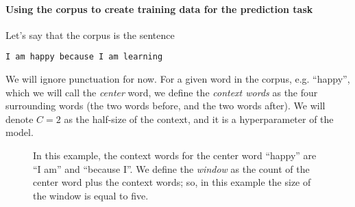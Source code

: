 \documentclass[12pt]{article}
\begin{document}
\paragraph{Using the corpus to create training data for the prediction task} Let's say that the corpus is the sentence
\begin{verbatim}
I am happy because I am learning
\end{verbatim}
We will ignore punctuation for now. For a given word in the corpus, e.g. ``happy'', which we will call the \emph{center} word, we define the \emph{context words} as the four surrounding words (the two words before, and the two words after). We will denote $C = 2$ as the half-size of the context, and it is a hyperparameter of the model.
\begin{figure}
  \begin{center}
    \caption{In this example, the context words for the center word ``happy'' are ``I am'' and ``because I''. We define the \emph{window} as the count of the center word plus the context words; so, in this example the size of the window is equal to five.}
  \end{center}
\end{figure}
\end{document}
